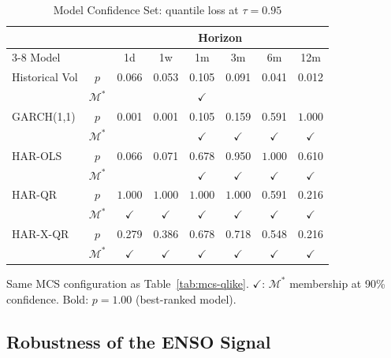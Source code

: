\begin{table}[H]
\centering
\small
\caption{Model Confidence Set: quantile loss at $\tau = 0.95$}
\label{tab:mcs-ql95}
\begin{tabular}{lccccccc}
\toprule
 & & \multicolumn{6}{c}{Horizon} \\
\cmidrule(lr){3-8}
Model & & 1d & 1w & 1m & 3m & 6m & 12m \\
\midrule
Historical Vol    & $p$ & 0.066 & 0.053 & 0.105 & 0.091 & 0.041 & 0.012 \\
                  & $\mathcal{M}^{*}$ &  &  & $\checkmark$ &  &  &  \\
\addlinespace
GARCH(1,1)        & $p$ & 0.001 & 0.001 & 0.105 & 0.159 & 0.591 & $\mathbf{1.000}$ \\
                  & $\mathcal{M}^{*}$ &  &  & $\checkmark$ & $\checkmark$ & $\checkmark$ & $\checkmark$ \\
\addlinespace
HAR-OLS           & $p$ & 0.066 & 0.071 & 0.678 & 0.950 & $\mathbf{1.000}$ & 0.610 \\
                  & $\mathcal{M}^{*}$ &  &  & $\checkmark$ & $\checkmark$ & $\checkmark$ & $\checkmark$ \\
\addlinespace
HAR-QR            & $p$ & $\mathbf{1.000}$ & $\mathbf{1.000}$ & $\mathbf{1.000}$ & $\mathbf{1.000}$ & 0.591 & 0.216 \\
                  & $\mathcal{M}^{*}$ & $\checkmark$ & $\checkmark$ & $\checkmark$ & $\checkmark$ & $\checkmark$ & $\checkmark$ \\
\addlinespace
HAR-X-QR          & $p$ & 0.279 & 0.386 & 0.678 & 0.718 & 0.548 & 0.216 \\
                  & $\mathcal{M}^{*}$ & $\checkmark$ & $\checkmark$ & $\checkmark$ & $\checkmark$ & $\checkmark$ & $\checkmark$ \\
\bottomrule
\end{tabular}
\par\smallskip
{\footnotesize Same MCS configuration as Table~\ref{tab:mcs-qlike}. $\checkmark$: $\mathcal{M}^{*}$ membership at 90\% confidence. Bold: $p = 1.00$ (best-ranked model).}
\end{table}

\subsection{Robustness of the ENSO Signal}
\label{sec:res-robustness}

